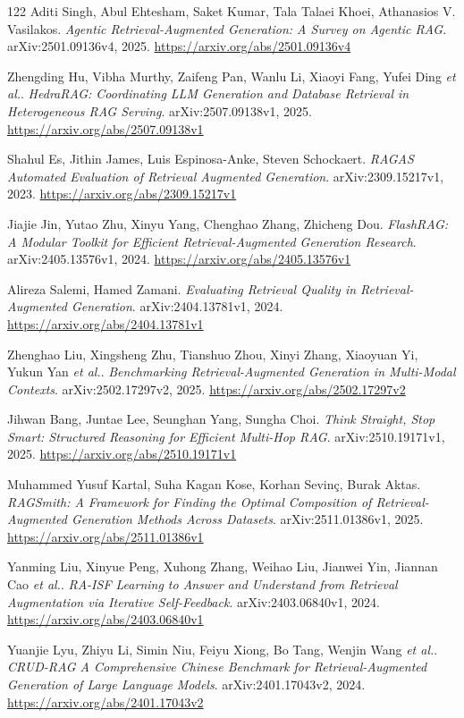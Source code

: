 \documentclass[11pt,a4paper]{article}
\begin{document}
\begin{thebibliography}{122}
Aditi Singh, Abul Ehtesham, Saket Kumar, Tala Talaei Khoei, Athanasios V. Vasilakos.
\newblock \emph{Agentic Retrieval-Augmented Generation: A Survey on Agentic RAG}.
\newblock arXiv:2501.09136v4, 2025.
\newblock \url{https://arxiv.org/abs/2501.09136v4}

Zhengding Hu, Vibha Murthy, Zaifeng Pan, Wanlu Li, Xiaoyi Fang, Yufei Ding \emph{et al.}.
\newblock \emph{HedraRAG: Coordinating LLM Generation and Database Retrieval in Heterogeneous RAG Serving}.
\newblock arXiv:2507.09138v1, 2025.
\newblock \url{https://arxiv.org/abs/2507.09138v1}

Shahul Es, Jithin James, Luis Espinosa-Anke, Steven Schockaert.
\newblock \emph{RAGAS Automated Evaluation of Retrieval Augmented Generation}.
\newblock arXiv:2309.15217v1, 2023.
\newblock \url{https://arxiv.org/abs/2309.15217v1}

Jiajie Jin, Yutao Zhu, Xinyu Yang, Chenghao Zhang, Zhicheng Dou.
\newblock \emph{FlashRAG: A Modular Toolkit for Efficient Retrieval-Augmented Generation Research}.
\newblock arXiv:2405.13576v1, 2024.
\newblock \url{https://arxiv.org/abs/2405.13576v1}

Alireza Salemi, Hamed Zamani.
\newblock \emph{Evaluating Retrieval Quality in Retrieval-Augmented Generation}.
\newblock arXiv:2404.13781v1, 2024.
\newblock \url{https://arxiv.org/abs/2404.13781v1}

Zhenghao Liu, Xingsheng Zhu, Tianshuo Zhou, Xinyi Zhang, Xiaoyuan Yi, Yukun Yan \emph{et al.}.
\newblock \emph{Benchmarking Retrieval-Augmented Generation in Multi-Modal Contexts}.
\newblock arXiv:2502.17297v2, 2025.
\newblock \url{https://arxiv.org/abs/2502.17297v2}

Jihwan Bang, Juntae Lee, Seunghan Yang, Sungha Choi.
\newblock \emph{Think Straight, Stop Smart: Structured Reasoning for Efficient Multi-Hop RAG}.
\newblock arXiv:2510.19171v1, 2025.
\newblock \url{https://arxiv.org/abs/2510.19171v1}

Muhammed Yusuf Kartal, Suha Kagan Kose, Korhan Sevin\c{c}, Burak Aktas.
\newblock \emph{RAGSmith: A Framework for Finding the Optimal Composition of Retrieval-Augmented Generation Methods Across Datasets}.
\newblock arXiv:2511.01386v1, 2025.
\newblock \url{https://arxiv.org/abs/2511.01386v1}

Yanming Liu, Xinyue Peng, Xuhong Zhang, Weihao Liu, Jianwei Yin, Jiannan Cao \emph{et al.}.
\newblock \emph{RA-ISF Learning to Answer and Understand from Retrieval Augmentation via Iterative Self-Feedback}.
\newblock arXiv:2403.06840v1, 2024.
\newblock \url{https://arxiv.org/abs/2403.06840v1}

Yuanjie Lyu, Zhiyu Li, Simin Niu, Feiyu Xiong, Bo Tang, Wenjin Wang \emph{et al.}.
\newblock \emph{CRUD-RAG A Comprehensive Chinese Benchmark for Retrieval-Augmented Generation of Large Language Models}.
\newblock arXiv:2401.17043v2, 2024.
\newblock \url{https://arxiv.org/abs/2401.17043v2}

\end{thebibliography}
\end{document}

